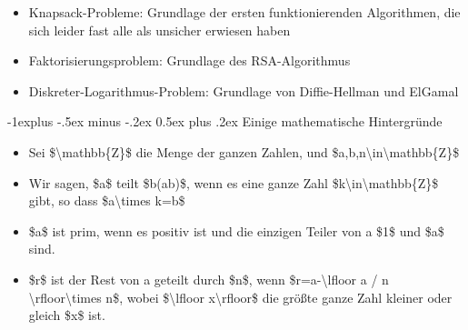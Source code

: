 \documentclass[a4paper]{article}
\makeatletter
\renewcommand{\subsection}{\@startsection{subsection}{2}{0mm}%
 {-1explus -.5ex minus -.2ex}%
 {0.5ex plus .2ex}%
 {\normalfont\normalsize\bfseries}}
\makeatother
\begin{document}
\begin{multicols}{3}
\begin{itemize}
\begin{itemize}
                        \begin{itemize}
                            \item
                                  Knapsack-Probleme: Grundlage der ersten funktionierenden
                                  Algorithmen, die sich leider fast alle als unsicher erwiesen haben
                            \item
                                  Faktorisierungsproblem: Grundlage des RSA-Algorithmus
                            \item
                                  Diskreter-Logarithmus-Problem: Grundlage von Diffie-Hellman und
                                  ElGamal
                        \end{itemize}
              \end{itemize}
    \end{itemize}


    \subsection{Einige mathematische
        Hintergründe}

    \begin{itemize}
        \item
              Sei \$\textbackslash mathbb\{Z\}\$ die Menge der ganzen Zahlen, und
              \$a,b,n\textbackslash in\textbackslash mathbb\{Z\}\$
        \item
              Wir sagen, \$a\$ teilt \$b(a\textbar b)\$, wenn es eine ganze Zahl
              \$k\textbackslash in\textbackslash mathbb\{Z\}\$ gibt, so dass
              \$a\textbackslash times k=b\$
        \item
              \$a\$ ist prim, wenn es positiv ist und die einzigen Teiler von a
              \$1\$ und \$a\$ sind.
        \item
              \$r\$ ist der Rest von a geteilt durch \$n\$, wenn
              \$r=a-\textbackslash lfloor a / n
              \textbackslash rfloor\textbackslash times n\$, wobei
              \$\textbackslash lfloor x\textbackslash rfloor\$ die größte ganze Zahl
              kleiner oder gleich \$x\$ ist.


\end{itemize}
\end{multicols}
\end{document}
